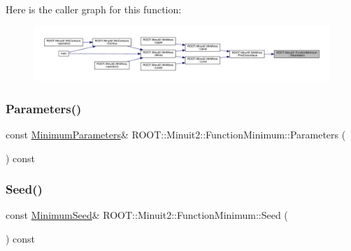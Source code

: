 Here is the caller graph for this function\+:\nopagebreak
\begin{figure}[H]
\begin{center}
\leavevmode
\includegraphics[width=350pt]{d4/dfb/classROOT_1_1Minuit2_1_1FunctionMinimum_a069ba097db08f87582b309330ef8aa6e_icgraph}
\end{center}
\end{figure}
\mbox{\label{classROOT_1_1Minuit2_1_1FunctionMinimum_a069ba097db08f87582b309330ef8aa6e}} 
\subsubsection{\texorpdfstring{Parameters()}{Parameters()}\hspace{0.1cm}{\footnotesize\ttfamily [2/2]}}
{\footnotesize\ttfamily const \mbox{\hyperlink{classROOT_1_1Minuit2_1_1MinimumParameters}{Minimum\+Parameters}}\& R\+O\+O\+T\+::\+Minuit2\+::\+Function\+Minimum\+::\+Parameters (\begin{DoxyParamCaption}{ }\end{DoxyParamCaption}) const\hspace{0.3cm}{\ttfamily [inline]}}

\mbox{\label{classROOT_1_1Minuit2_1_1FunctionMinimum_a9812689b192b202a73ce1178e8098705}} 
\subsubsection{\texorpdfstring{Seed()}{Seed()}\hspace{0.1cm}{\footnotesize\ttfamily [1/2]}}
{\footnotesize\ttfamily const \mbox{\hyperlink{classROOT_1_1Minuit2_1_1MinimumSeed}{Minimum\+Seed}}\& R\+O\+O\+T\+::\+Minuit2\+::\+Function\+Minimum\+::\+Seed (\begin{DoxyParamCaption}{ }\end{DoxyParamCaption}) const\hspace{0.3cm}{\ttfamily [inline]}}

